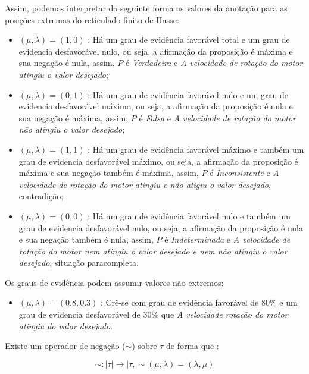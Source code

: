 Assim, podemos interpretar da seguinte forma os valores da anotação para as posições extremas do reticulado finito de Hasse:

\begin{itemize}
\item 
$(\mu, \lambda ) = (1,0)$ : Há um grau de evidência favorável total e um grau de evidencia desfavorável nulo, ou seja, a afirmação da proposição é máxima e sua negação é nula, assim,  $P$ é \emph{Verdadeira} e \emph{A velocidade de rotação do motor atingiu o valor desejado};

\item 
$(\mu, \lambda ) = (0,1)$ : Há um grau de evidência favorável nulo e um grau de evidencia desfavorável máximo, ou seja, a afirmação da proposição é nula e sua negação é máxima, assim,  $P$ é \emph{Falsa} e \emph{A velocidade de rotação do motor não atingiu o valor desejado};

\item 
$(\mu, \lambda ) = (1,1)$ : Há um grau de evidência favorável máximo e também um grau de evidencia desfavorável máximo, ou seja, a afirmação da proposição é máxima e sua negação também é máxima, assim,  $P$ é \emph{Inconsistente} e \emph{A velocidade de rotação do motor atingiu e não atigiu o valor desejado}, contradição;

\item 
$(\mu, \lambda ) = (0,0)$ : Há um grau de evidência favorável nulo e também um grau de evidencia desfavorável nulo, ou seja, a afirmação da proposição é nula e sua negação também é nula, assim,  $P$ é \emph{Indeterminada} e \emph{A velocidade de rotação do motor nem atingiu o valor desejado e nem não atingiu o valor desejado}, situação paracompleta.

\end{itemize}

Os graus de evidência podem assumir valores não extremos:

\begin{itemize}
\item 
$(\mu, \lambda ) = (0.8,0.3)$ : Crê-se com grau de evidência favorável de 80\% e um grau de evidencia desfavorável de 30\%  que \emph{A velocidade rotação do motor atingiu do valor desejado}.
\end{itemize}

Existe um operador de negação ($\sim $) sobre $\tau$ de forma que :
\begin{center}
\begin{equation}
\sim  : \mid \tau \mid \rightarrow \mid \tau , \sim(\mu, \lambda ) = (\lambda, \mu )
\end{equation}
\end{center}

